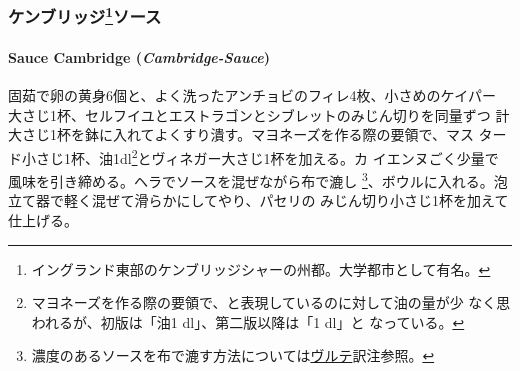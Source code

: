 \begin{recette}
\hypertarget{ux30b1ux30f3ux30d6ux30eaux30c3ux30b858ux30bdux30fcux30b9}{%
\subsubsection[ケンブリッジソース]{\texorpdfstring{ケンブリッジ\footnote{イングランド東部のケンブリッジシャーの州都。大学都市として有名。}ソース}{ケンブリッジソース}}\label{ux30b1ux30f3ux30d6ux30eaux30c3ux30b858ux30bdux30fcux30b9}}

\hypertarget{cambridge-sauce}{%
\paragraph{\texorpdfstring{Sauce Cambridge
(\emph{Cambridge-Sauce})}{Sauce Cambridge (Cambridge-Sauce)}}\label{cambridge-sauce}}


固茹で卵の黄身6個と、よく洗ったアンチョビのフィレ4枚、小さめのケイパー
大さじ1杯、セルフイユとエストラゴンとシブレットのみじん切りを同量ずつ
計大さじ1杯を鉢に入れてよくすり潰す。マヨネーズを作る際の要領で、マス
タード小さじ1杯、油1\undemi{}dl\footnote{マヨネーズを作る際の要領で、と表現しているのに対して油の量が少
  なく思われるが、初版は「油1 dl」、第二版以降は「1\undemi{} dl」と
  なっている。}とヴィネガー大さじ1杯を加える。カ
イエンヌごく少量で風味を引き締める。ヘラでソースを混ぜながら布で漉し
\footnote{濃度のあるソースを布で漉す方法については\protect\hyperlink{veloute}{ヴルテ}訳注参照。}、ボウルに入れる。泡立て器で軽く混ぜて滑らかにしてやり、パセリの
みじん切り小さじ1杯を加えて仕上げる。

\maeaki

\hypertarget{ux30abux30f3ux30d0ux30fcux30e9ux30f3ux30c959ux30bdux30fcux30b9}{%
}
\end{recette}
